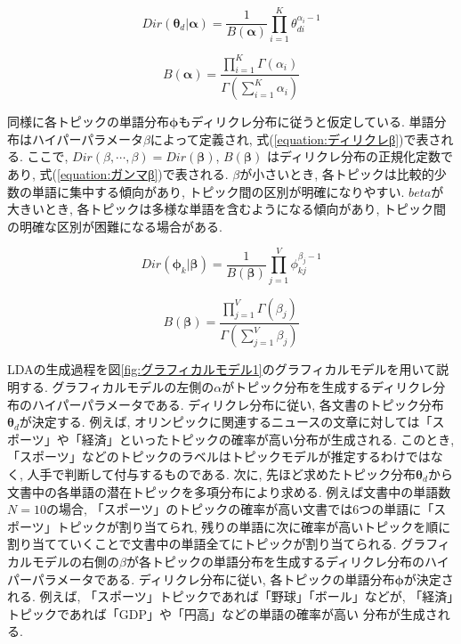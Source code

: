 \documentclass{ltjarticle}
\begin{document}
\begin{equation}
    Dir(\boldsymbol{\theta}_d|\boldsymbol{\alpha}) = \frac{1}{B(\boldsymbol{\alpha})}\prod_{i=1}^{K}\theta_{di}^{\alpha_i-1}
    \label{equation:ディリクレα}
\end{equation}
\vspace{5truept}

\begin{equation}
    B(\boldsymbol{\alpha}) = \frac{\prod_{i=1}^{K}\Gamma(\alpha_i)}{\Gamma(\sum_{i=1}^{K} \alpha_i)}
    \label{equation:ガンマα}
\end{equation}
\vspace{10truept}



同様に各トピックの単語分布$\boldsymbol{\phi}$もディリクレ分布に従うと仮定している. 
単語分布はハイパーパラメータ$\beta$によって定義され, 式(\ref{equation:ディリクレβ})で表される. 
ここで, $Dir(\beta, \cdots, \beta)=Dir(\boldsymbol{\beta})$, $B(\boldsymbol{\beta})$
はディリクレ分布の正規化定数であり, 式(\ref{equation:ガンマβ})で表される. 
$\beta$が小さいとき, 各トピックは比較的少数の単語に集中する傾向があり, 
トピック間の区別が明確になりやすい. 
$beta$が大きいとき, 各トピックは多様な単語を含むようになる傾向があり, 
トピック間の明確な区別が困難になる場合がある. 
\vspace{5truept}

\begin{equation}
    Dir(\boldsymbol{\phi}_k|\boldsymbol{\beta}) = \frac{1}{B(\boldsymbol{\beta})}\prod_{j=1}^{V}\phi_{kj}^{\beta_j-1}
    \label{equation:ディリクレβ}
\end{equation}
\vspace{5truept}

\begin{equation}
    B(\boldsymbol{\beta}) = \frac{\prod_{j=1}^{V}\Gamma(\beta_j)}{\Gamma(\sum_{j=1}^{V} \beta_j)}
    \label{equation:ガンマβ}
\end{equation}
\vspace{10truept}

LDAの生成過程を図\ref{fig:グラフィカルモデル1}のグラフィカルモデルを用いて説明する. 
グラフィカルモデルの左側の$\alpha$がトピック分布を生成するディリクレ分布のハイパーパラメータである. 
ディリクレ分布に従い, 各文書のトピック分布$\boldsymbol{\theta}_d$が決定する. 
例えば, オリンピックに関連するニュースの文章に対しては「スポーツ」や「経済」といったトピックの確率が高い分布が生成される. 
このとき, 「スポーツ」などのトピックのラベルはトピックモデルが推定するわけではなく, 人手で判断して付与するものである. 
次に, 先ほど求めたトピック分布$\boldsymbol{\theta}_d$から文書中の各単語の潜在トピックを多項分布により求める. 
例えば文書中の単語数$N=10$の場合, 「スポーツ」のトピックの確率が高い文書では6つの単語に「スポーツ」トピックが割り当てられ, 
残りの単語に次に確率が高いトピックを順に割り当てていくことで文書中の単語全てにトピックが割り当てられる. 
グラフィカルモデルの右側の$\beta$が各トピックの単語分布を生成するディリクレ分布のハイパーパラメータである. 
ディリクレ分布に従い, 各トピックの単語分布$\boldsymbol{\phi}$が決定される. 
例えば, 「スポーツ」トピックであれば「野球」「ボール」などが, 「経済」トピックであれば「GDP」や「円高」などの単語の確率が高い
分布が生成される. 
\end{document}
